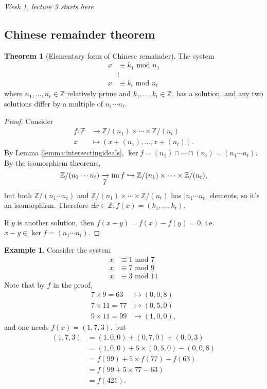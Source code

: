 \documentclass[a4paper]{article}
\newcommand{\Z}{\mathbb{Z}}
\newcommand{\im}{\text{im\,}}
\newcommand{\Mod}{\text{ mod }}
\theoremstyle{definition}
\newtheorem{thm}[defn]{Theorem}
\newtheorem{example}[defn]{Example}
\begin{document}
\begin{flushright}
\textit{Week 1, lecture 3 starts here}
\end{flushright}

\subsection{Chinese remainder theorem}
\begin{thm}[Elementary form of Chinese remainder]
The system
\[
\begin{aligned}
x&\equiv k_1\Mod n_1 \\
&\vdots \\
x&\equiv k_t\Mod n_t
\end{aligned}
\]
where $n_1,\ldots,n_t\in\Z$ relatively prime and $k_1,\ldots,k_t\in\Z$, has a solution, and any two solutions differ by a multiple of $n_1\cdots n_t$.
\end{thm}

\begin{proof}
Consider
\[
\begin{aligned}
f:\Z&\rightarrow \Z/(n_1)\times\cdots\times\Z/(n_t) \\
x&\mapsto (x+(n_1),\ldots,x+(n_t)).
\end{aligned}
\]
By Lemma \ref{lemma:intersectingideals}, $\ker f=(n_1)\cap\cdots\cap(n_t)=(n_1\cdots n_t)$. By the isomorphism theorems,
\[
\Z/(n_1\cdots n_t)\xrightarrow[\overline{f}]{} \im f\hookrightarrow \Z/(n_1)\times\cdots\times\Z/(n_t),
\]
but both $\Z/(n_1\cdots n_t)$ and $\Z/(n_1)\times\cdots\times\Z/(n_t)$ has $|n_1\cdots n_t|$ elements, so it's an isomorphism. Therefore $\exists x\in\Z:f(x)=(k_1,\ldots,k_t)$.

If $y$ is another solution, then $f(x-y)=f(x)-f(y)=0$, i.e. $x-y\in\ker f=(n_1\cdots n_t)$.
\end{proof}

\begin{example}
Consider the system
\[
\begin{aligned}
x&\equiv 1\Mod 7 \\
x&\equiv 7\Mod 9 \\
x&\equiv 3\Mod 11
\end{aligned}
\]
Note that by $f$ in the proof,
\[
\begin{aligned}
7\times 9=63&\mapsto (0,0,8) \\
7\times 11=77&\mapsto (0,5,0) \\
9\times 11=99&\mapsto (1,0,0),
\end{aligned}
\]
and one needs $f(x)=(1,7,3)$, but
\[
\begin{aligned}
(1,7,3)&=(1,0,0)+(0,7,0)+(0,0,3)\\
&=(1,0,0)+5\times (0,5,0)-(0,0,8) \\
&=f(99)+5\times f(77)-f(63) \\
&=f(99+5\times 77-63) \\
&=f(421).
\end{aligned}
\]
\end{example}
\end{document}
